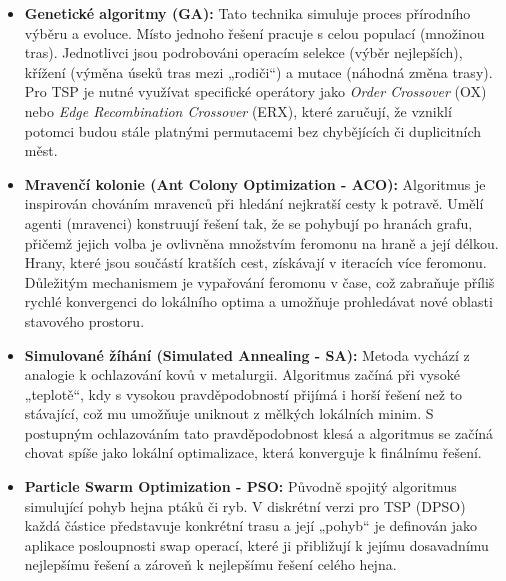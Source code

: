 \begin{itemize}
    \item \textbf{Genetické algoritmy (GA):} Tato technika simuluje proces přírodního výběru a evoluce. Místo jednoho řešení pracuje s celou populací (množinou tras). Jednotlivci jsou podrobováni operacím selekce (výběr nejlepších), křížení (výměna úseků tras mezi „rodiči“) a mutace (náhodná změna trasy). Pro TSP je nutné využívat specifické operátory jako \textit{Order Crossover} (OX) nebo \textit{Edge Recombination Crossover} (ERX), které zaručují, že vzniklí potomci budou stále platnými permutacemi bez chybějících či duplicitních měst.
    
    \item \textbf{Mravenčí kolonie (Ant Colony Optimization - ACO):} Algoritmus je inspirován chováním mravenců při hledání nejkratší cesty k potravě. Umělí agenti (mravenci) konstruují řešení tak, že se pohybují po hranách grafu, přičemž jejich volba je ovlivněna množstvím feromonu na hraně a její délkou. Hrany, které jsou součástí kratších cest, získávají v iteracích více feromonu. Důležitým mechanismem je vypařování feromonu v čase, což zabraňuje příliš rychlé konvergenci do lokálního optima a umožňuje prohledávat nové oblasti stavového prostoru.
    
    \item \textbf{Simulované žíhání (Simulated Annealing - SA):} Metoda vychází z analogie k ochlazování kovů v metalurgii. Algoritmus začíná při vysoké „teplotě“, kdy s vysokou pravděpodobností přijímá i horší řešení než to stávající, což mu umožňuje uniknout z mělkých lokálních minim. S postupným ochlazováním tato pravděpodobnost klesá a algoritmus se začíná chovat spíše jako lokální optimalizace, která konverguje k finálnímu řešení.
    
    \item \textbf{Particle Swarm Optimization - PSO:} Původně spojitý algoritmus simulující pohyb hejna ptáků či ryb. V diskrétní verzi pro TSP (DPSO) každá částice představuje konkrétní trasu a její „pohyb“ je definován jako aplikace posloupnosti swap operací, které ji přibližují k jejímu dosavadnímu nejlepšímu řešení a zároveň k nejlepšímu řešení celého hejna.
    

\end{itemize}
